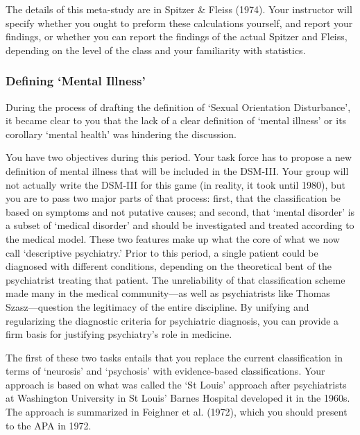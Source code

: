 \begin{refsection}
\begin{itemize}
\end{itemize}

The details of this meta-study are in Spitzer \& Fleiss (1974). Your instructor will specify whether you ought to preform these calculations yourself, and report your findings, or whether you can report the findings of the actual Spitzer and Fleiss, depending on the level of the class and your familiarity with statistics.

\subsubsection{Defining `Mental Illness'}
\label{definingmentalillness}

During the process of drafting the definition of `Sexual Orientation Disturbance', it became clear to you that the lack of a clear definition of `mental illness' or its corollary `mental health' was hindering the discussion.

You have two objectives during this period. Your task force has to propose a new definition of mental illness that will be included in the DSM-III. Your group will not actually write the DSM-III for this game (in reality, it took until 1980), but you are to pass two major parts of that process: first, that the classification be based on symptoms and not putative causes; and second, that `mental disorder' is a subset of `medical disorder' and should be investigated and treated according to the medical model. These two features make up what the core of what we now call `descriptive psychiatry.' Prior to this period, a single patient could be diagnosed with different conditions, depending on the theoretical bent of the psychiatrist treating that patient. The unreliability of that classification scheme made many in the medical community---as well as psychiatrists like Thomas Szasz---question the legitimacy of the entire discipline. By unifying and regularizing the diagnostic criteria for psychiatric diagnosis, you can provide a firm basis for justifying psychiatry's role in medicine.

The first of these two tasks entails that you replace the current classification in terms of `neurosis' and `psychosis' with evidence-based classifications. Your approach is based on what was called the `St Louis' approach after psychiatrists at Washington University in St Louis' Barnes Hospital developed it in the 1960s. The approach is summarized in Feighner et al. (1972), which you should present to the APA in 1972.


\end{refsection}
